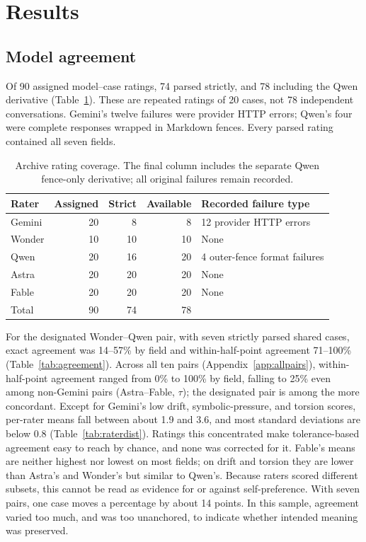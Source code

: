 \documentclass[11pt]{article}
\begin{document}
\section{Results}
\subsection{Model agreement}
Of 90 assigned model--case ratings, 74 parsed strictly, and 78 including the Qwen derivative (Table~\ref{tab:coverage}). These are repeated ratings of 20 cases, not 78 independent conversations. Gemini's twelve failures were provider HTTP errors; Qwen's four were complete responses wrapped in Markdown fences. Every parsed rating contained all seven fields.

\begin{table}[htbp]
\centering\small
\caption{Archive rating coverage. The final column includes the separate Qwen fence-only derivative; all original failures remain recorded.}
\label{tab:coverage}
\begin{tabular}{@{}lrrrl@{}}
\toprule
Rater & Assigned & Strict & Available & Recorded failure type \\
\midrule
Gemini & 20 & 8 & 8 & 12 provider HTTP errors \\
Wonder & 10 & 10 & 10 & None \\
Qwen & 20 & 16 & 20 & 4 outer-fence format failures \\
Astra & 20 & 20 & 20 & None \\
Fable & 20 & 20 & 20 & None \\
\midrule
Total & 90 & 74 & 78 & \\
\bottomrule
\end{tabular}
\end{table}

For the designated Wonder--Qwen pair, with seven strictly parsed shared cases, exact agreement was 14--57\% by field and within-half-point agreement 71--100\% (Table~\ref{tab:agreement}). Across all ten pairs (Appendix~\ref{app:allpairs}), within-half-point agreement ranged from 0\% to 100\% by field, falling to 25\% even among non-Gemini pairs (Astra--Fable, $\tau$); the designated pair is among the more concordant. Except for Gemini's low drift, symbolic-pressure, and torsion scores, per-rater means fall between about 1.9 and 3.6, and most standard deviations are below 0.8 (Table~\ref{tab:raterdist}). Ratings this concentrated make tolerance-based agreement easy to reach by chance, and none was corrected for it. Fable's means are neither highest nor lowest on most fields; on drift and torsion they are lower than Astra's and Wonder's but similar to Qwen's. Because raters scored different subsets, this cannot be read as evidence for or against self-preference. With seven pairs, one case moves a percentage by about 14 points. In this sample, agreement varied too much, and was too unanchored, to indicate whether intended meaning was preserved.
\end{document}
